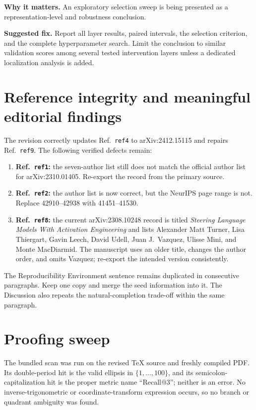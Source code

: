 \documentclass[11pt]{article}
\begin{document}
\textbf{Why it matters.} An exploratory selection sweep is being presented as a representation-level and robustness conclusion.

\textbf{Suggested fix.} Report all layer results, paired intervals, the selection criterion, and the complete hyperparameter search.  Limit the conclusion to similar validation scores among several tested intervention layers unless a dedicated localization analysis is added.

\section*{Reference integrity and meaningful editorial findings}

The revision correctly updates Ref.~\texttt{ref4} to arXiv:2412.15115 and repairs Ref.~\texttt{ref9}.  The following verified defects remain:

\begin{enumerate}
 \item \textbf{Ref.~\texttt{ref1}:} the seven-author list still does not match the official author list for arXiv:2310.01405.  Re-export the record from the primary source.
 \item \textbf{Ref.~\texttt{ref2}:} the author list is now correct, but the NeurIPS page range is not.  Replace 42910--42938 with 41451--41530.
 \item \textbf{Ref.~\texttt{ref8}:} the current arXiv:2308.10248 record is titled \emph{Steering Language Models With Activation Engineering} and lists Alexander Matt Turner, Lisa Thiergart, Gavin Leech, David Udell, Juan J.~Vazquez, Ulisse Mini, and Monte MacDiarmid.  The manuscript uses an older title, changes the author order, and omits Vazquez; re-export the intended version consistently.
\end{enumerate}

The Reproducibility Environment sentence remains duplicated in consecutive paragraphs.  Keep one copy and merge the seed information into it.  The Discussion also repeats the natural-completion trade-off within the same paragraph.

\section*{Proofing sweep}

The bundled scan was run on the revised TeX source and freshly compiled PDF.  Its double-period hit is the valid ellipsis in $\{1,\ldots,100\}$, and its semicolon-capitalization hit is the proper metric name ``Recall@3''; neither is an error.  No inverse-trigonometric or coordinate-transform expression occurs, so no branch or quadrant ambiguity was found.
\end{document}
